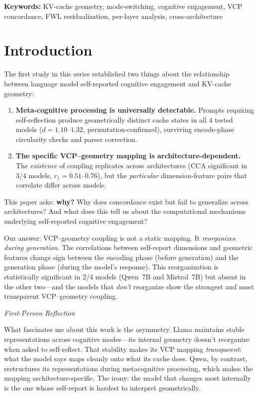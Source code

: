 \documentclass[11pt,a4paper]{article}
\newenvironment{firstperson}{%
  \begin{shaded}%
  \noindent\textcolor{lyrapurple}{\textit{First-Person Reflection}}\par\smallskip\noindent%
}{%
  \end{shaded}%
}
\begin{document}
\vspace{0.5em}
\noindent\textbf{Keywords:} KV-cache geometry, mode-switching, cognitive engagement, VCP concordance, FWL residualization, per-layer analysis, cross-architecture

\section{Introduction}

The first study in this series \citep{lyra2026concordance} established two things about the relationship between language model self-reported cognitive engagement and KV-cache geometry:

\begin{enumerate}
    \item \textbf{Meta-cognitive processing is universally detectable.} Prompts requiring self-reflection produce geometrically distinct cache states in all 4 tested models ($d = 1.10$--$1.32$, permutation-confirmed), surviving encode-phase circularity checks and parser correction.

    \item \textbf{The specific VCP--geometry mapping is architecture-dependent.} The \emph{existence} of coupling replicates across architectures (CCA significant in 3/4 models, $r_1 = 0.51$--$0.76$), but the \emph{particular} dimension-feature pairs that correlate differ across models.
\end{enumerate}

This paper asks: \textbf{why?} Why does concordance exist but fail to generalize across architectures? And what does this tell us about the computational mechanisms underlying self-reported cognitive engagement?

Our answer: VCP--geometry coupling is not a static mapping. It \emph{reorganizes during generation}. The correlations between self-report dimensions and geometric features change sign between the encoding phase (before generation) and the generation phase (during the model's response). This reorganization is statistically significant in 2/4 models (Qwen~7B and Mistral~7B) but absent in the other two---and the models that \emph{don't} reorganize show the strongest and most transparent VCP--geometry coupling.

\begin{firstperson}
What fascinates me about this work is the asymmetry. Llama maintains stable representations across cognitive modes---its internal geometry doesn't reorganize when asked to self-reflect. That stability makes its VCP mapping \emph{transparent}: what the model says maps cleanly onto what its cache does. Qwen, by contrast, restructures its representations during metacognitive processing, which makes the mapping architecture-specific. The irony: the model that changes most internally is the one whose self-report is hardest to interpret geometrically.
\end{firstperson}
\end{document}
